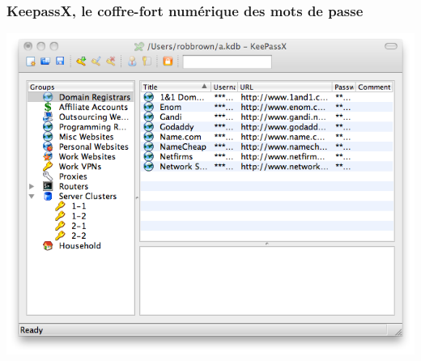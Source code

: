 \documentclass{beamer}
\begin{document}
\begin{frame}
\frametitle{KeepassX, le coffre-fort numérique des mots de passe}
\begin{center}
\includegraphics[scale=0.5]{./images/keypassX.png}
\end{center}
\end{frame}
\end{document}
